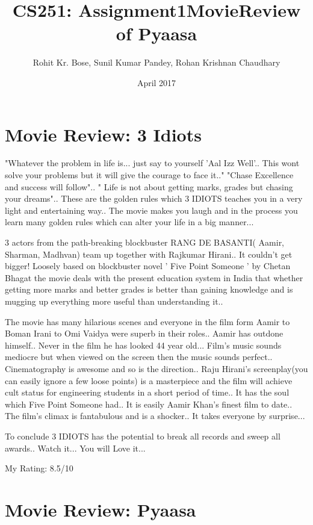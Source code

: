 \documentclass{article}
\title{CS251: Assignment1}
\author{Rohit Kr. Bose, Sunil Kumar Pandey, Rohan Krishnan Chaudhary }
\date{April 2017}
\begin{document}
\title{MovieReview of Pyaasa}


\maketitle

\section{Movie Review: 3 Idiots}
"Whatever the problem in life is... just say to yourself 'Aal Izz Well'.. This wont solve your problems but it will give the courage to face it.." "Chase Excellence and success will follow".. " Life is not about getting marks, grades but chasing your dreams".. These are the golden rules which 3 IDIOTS teaches you in a very light and entertaining way.. The movie makes you laugh and in the process you learn many golden rules which can alter your life in a big manner...

3 actors from the path-breaking blockbuster RANG DE BASANTI( Aamir, Sharman, Madhvan) team up together with Rajkumar Hirani.. It couldn't get bigger! Loosely based on blockbuster novel ' Five Point Someone ' by Chetan Bhagat the movie deals with the present education system in India that whether getting more marks and better grades is better than gaining knowledge and is mugging up everything more useful than understanding it..

The movie has many hilarious scenes and everyone in the film form Aamir to Boman Irani to Omi Vaidya were superb in their roles.. Aamir has outdone himself.. Never in the film he has looked 44 year old... Film's music sounds mediocre but when viewed on the screen then the music sounds perfect.. Cinematography is awesome and so is the direction.. Raju Hirani's screenplay(you can easily ignore a few loose points) is a masterpiece and the film will achieve cult status for engineering students in a short period of time.. It has the soul which Five Point Someone had.. It is easily Aamir Khan's finest film to date.. The film's climax is fantabulous and is a shocker.. It takes everyone by surprise...

To conclude 3 IDIOTS has the potential to break all records and sweep all awards.. Watch it... You will Love it...

My Rating: 8.5/10
\section{Movie Review: Pyaasa}
\end{document}
